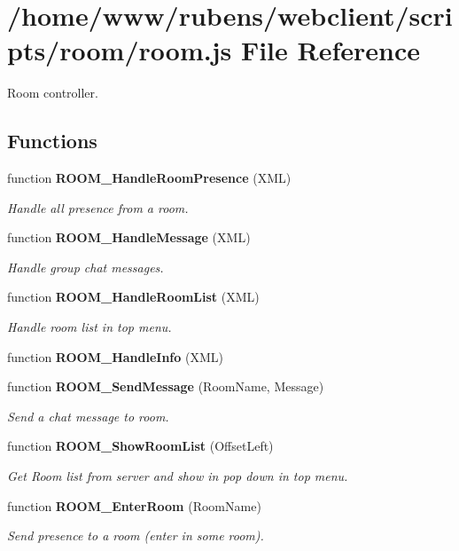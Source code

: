 \section{/home/www/rubens/webclient/scripts/room/room.js File Reference}
\label{room_2room_8js}
Room controller. 

\subsection*{Functions}
\begin{CompactItemize}
\item 
function {\bf ROOM\_\-HandleRoomPresence} (XML)
\begin{CompactList}\small\item\em Handle all presence from a room. \item\end{CompactList}\item 
function {\bf ROOM\_\-HandleMessage} (XML)
\begin{CompactList}\small\item\em Handle group chat messages. \item\end{CompactList}\item 
function {\bf ROOM\_\-HandleRoomList} (XML)
\begin{CompactList}\small\item\em Handle room list in top menu. \item\end{CompactList}\item 
function {\bf ROOM\_\-HandleInfo} (XML)
\item 
function {\bf ROOM\_\-SendMessage} (RoomName, Message)
\begin{CompactList}\small\item\em Send a chat message to room. \item\end{CompactList}\item 
function {\bf ROOM\_\-ShowRoomList} (OffsetLeft)
\begin{CompactList}\small\item\em Get Room list from server and show in pop down in top menu. \item\end{CompactList}\item 
function {\bf ROOM\_\-EnterRoom} (RoomName)
\begin{CompactList}\small\item\em Send presence to a room (enter in some room). \item\end{CompactList}\item 

\end{CompactItemize}
